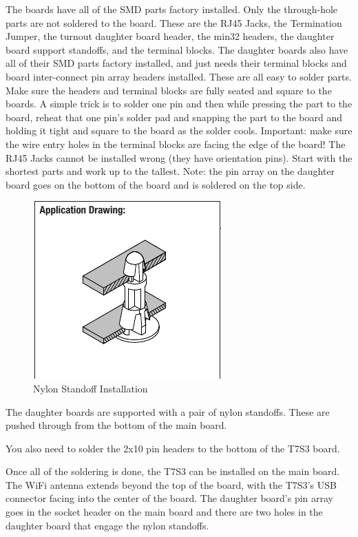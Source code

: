 The boards have all of the SMD parts factory installed. Only the through-hole
parts are not soldered to the board. These are the RJ45 Jacks, the Termination
Jumper, the turnout daughter board header, the min32 headers, the daughter
board support standoffs, and the terminal blocks. The daughter boards also
have all of their SMD parts factory installed, and just needs their terminal
blocks and board inter-connect pin array headers installed. These are all easy
to solder parts. Make sure the headers and terminal blocks are fully seated
and square to the boards. A simple trick is to solder one pin and then while
pressing the part to the board, reheat that one pin's solder pad and snapping
the part to the board and holding it tight and square to the board as the
solder cools. Important: make sure the wire entry holes in the terminal blocks
are facing the edge of the board! The RJ45 Jacks cannot be installed wrong
(they have orientation pins). Start with the shortest parts and work up to the
tallest. Note: the pin array on the daughter board goes on the bottom of the
board and is soldered on the top side.


\begin{figure}[hbpt]\begin{centering}%
\includegraphics{NylonStandoffInstall.png}
\caption{Nylon Standoff Installation}
\end{centering}\end{figure}

The daughter boards are supported with a pair of nylon standoffs.  These are 
pushed through from the bottom of the main board.

You also need to solder the 2x10 pin headers to the bottom of the T7S3 board.


Once all of the soldering is done, the T7S3 can be installed on the main board.
The WiFi antenna extends beyond the top of the board, with the T7S3's USB 
connector facing into the center of the board.  The daughter board's pin array 
goes in the socket header on the main board and there are two holes in the 
daughter board that engage the nylon standoffs.


\clearpage
